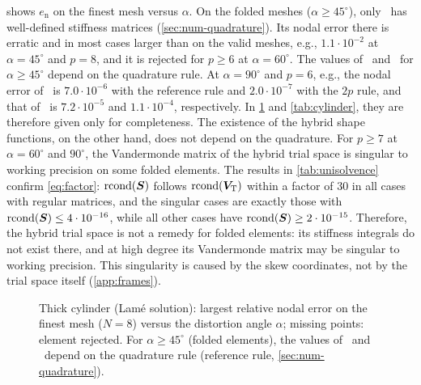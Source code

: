  shows $e_{\mathrm{n}}$ on the finest mesh versus $\alpha$. On the folded meshes ($\alpha\ge45^\circ$), only \PM\ has well-defined stiffness matrices (\cref{sec:num-quadrature}). Its nodal error there is erratic and in most cases larger than on the valid meshes, e.g., $1.1\cdot10^{-2}$ at $\alpha=45^\circ$ and $p=8$, and it is rejected for $p\ge6$ at $\alpha=60^\circ$. The values of \PP\ and \PH\ for $\alpha\ge45^\circ$ depend on the quadrature rule. At $\alpha=90^\circ$ and $p=6$, e.g., the nodal error of \PH\ is $7.0\cdot10^{-6}$ with the reference rule and $2.0\cdot10^{-7}$ with the $2p$ rule, and that of \PP\ is $7.2\cdot10^{-5}$ and $1.1\cdot10^{-4}$, respectively. In \cref{fig:cylinder} and \cref{tab:cylinder}, they are therefore given only for completeness. The existence of the hybrid shape functions, on the other hand, does not depend on the quadrature. For $p\ge7$ at $\alpha=60^\circ$ and $90^\circ$, the Vandermonde matrix of the hybrid trial space is singular to working precision on some folded elements. The results in \cref{tab:unisolvence} confirm \cref{eq:factor}: $\mathrm{rcond}(\bm{S})$ follows $\mathrm{rcond}(\bm{V}_{\mathrm{T}})$ within a factor of $30$ in all cases with regular matrices, and the singular cases are exactly those with $\mathrm{rcond}(\bm{S})\le4\cdot10^{-16}$, while all other cases have $\mathrm{rcond}(\bm{S})\ge2\cdot10^{-15}$. Therefore, the hybrid trial space is not a remedy for folded elements: its stiffness integrals do not exist there, and at high degree its Vandermonde matrix may be singular to working precision. This singularity is caused by the skew coordinates, not by the trial space itself (\cref{app:frames}).

\begin{figure}[htbp]
  \centering
  
  \caption{Thick cylinder (Lam\'e solution): largest relative nodal error on the finest mesh ($N=8$) versus the distortion angle $\alpha$; missing points: element rejected. For $\alpha\ge45^\circ$ (folded elements), the values of \PP\ and \PH\ depend on the quadrature rule (reference rule, \cref{sec:num-quadrature}).}
  \label{fig:cylinder}
\end{figure}

\begin{table}[htbp]
  \centering\small
  \caption{Hybrid Vandermonde matrix on the thick-cylinder meshes, with the complete polynomials in skew coordinates: smallest value over the elements of $\mathrm{rcond}$ of $\matr V_{\mathrm{T}}$, of $\matr S$ (\cref{eq:factor}) and of the Vandermonde matrix $\matr V_{\mathrm{Q}}$ of \PM; number of elements with $\mathrm{rcond}(\matr V_{\mathrm{T}})<\varepsilon_{\mathrm{mach}}$.}
  \label{tab:unisolvence}
  
\end{table}
